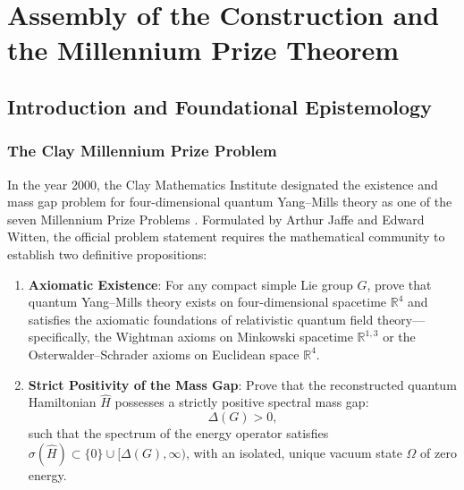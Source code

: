\chapter{Assembly of the Construction and the Millennium Prize Theorem}
\label{ch:assembly_main_theorem}
\label{ch:assembly}

\section{Introduction and Foundational Epistemology}
\label{sec:ch17_intro}

\subsection{The Clay Millennium Prize Problem}
\label{subsec:millennium_problem_formulation}

In the year 2000, the Clay Mathematics Institute designated the existence and mass gap problem for four-dimensional quantum Yang--Mills theory as one of the seven Millennium Prize Problems \cite{JaffeWitten2000}. Formulated by Arthur Jaffe and Edward Witten, the official problem statement requires the mathematical community to establish two definitive propositions:
\begin{enumerate}[label=\textbf{Part \arabic*:}, leftmargin=*]
    \item \textbf{Axiomatic Existence}: For any compact simple Lie group $G$, prove that quantum Yang--Mills theory exists on four-dimensional spacetime $\mathbb{R}^4$ and satisfies the axiomatic foundations of relativistic quantum field theory—specifically, the Wightman axioms on Minkowski spacetime $\mathbb{R}^{1,3}$ or the Osterwalder--Schrader axioms on Euclidean space $\mathbb{R}^4$.
    \item \textbf{Strict Positivity of the Mass Gap}: Prove that the reconstructed quantum Hamiltonian $\hat{H}$ possesses a strictly positive spectral mass gap:
    \begin{equation}
    \label{eq:millennium_gap_goal}
    \Delta(G) > 0,
    \end{equation}
    such that the spectrum of the energy operator satisfies $\sigma(\hat{H}) \subset \{0\} \cup [\Delta(G), \infty)$, with an isolated, unique vacuum state $\Omega$ of zero energy.
\end{enumerate}

